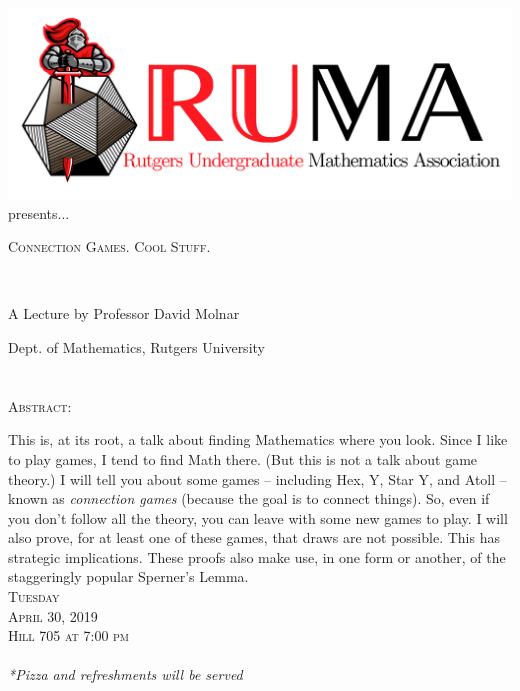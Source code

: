 \documentclass[12pt]{article}
\begin{document}

\begin{center}\includegraphics[scale=.35]{RUMAlogo.png}\\
presents... \\
\begin{spacing}{1}
{\fontsize{40}{44}\selectfont  \textsc{
Connection Games. Cool Stuff.}} \end{spacing}
 

~~\\
\begin{spacing}{1.5}
{\fontsize{24}{24} \selectfont A Lecture by Professor David Molnar}  \end{spacing}
\large Dept. of Mathematics, Rutgers University \\~~\\
~~\\

\normalsize
\textsc{Abstract:}

\Large 
This is, at its root, a talk about finding Mathematics where you
look. Since I like to play games, I tend to find Math there. (But
this is not a talk about game theory.)
I will tell you about some games -- including Hex, Y, Star Y, and
Atoll -- known as {\it connection games} (because the goal is to
connect things). So, even if you don't follow all the theory, you
can leave with some new games to play. I will also prove, for at
least one of these games, that draws are not possible. This has
strategic implications. These proofs also make use, in one form or
another, of the staggeringly popular Sperner's Lemma.\\

\vspace{10mm} 
\Huge   \textsc{Tuesday\\April 30, 2019 \\Hill 705 at 7:00 pm} \\~\\
\large
\emph{*Pizza and refreshments will be served}
\end{center}
\end{document}
